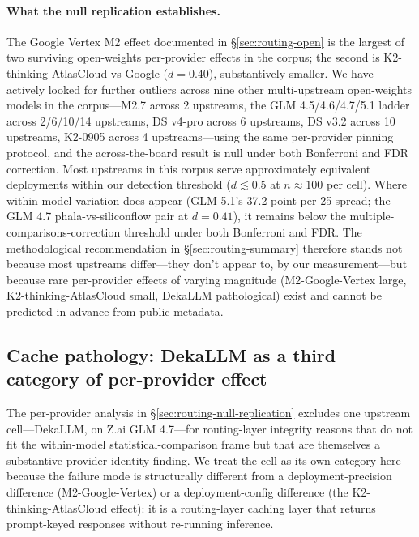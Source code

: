 \documentclass[11pt,a4paper]{article}
\begin{document}
\paragraph{What the null replication establishes.} The Google Vertex M2 effect documented in \S\ref{sec:routing-open} is the largest of two surviving open-weights per-provider effects in the corpus; the second is K2-thinking-AtlasCloud-vs-Google ($d{=}0.40$), substantively smaller. We have actively looked for further outliers across nine other multi-upstream open-weights models in the corpus---M2.7 across 2 upstreams, the GLM 4.5/4.6/4.7/5.1 ladder across 2/6/10/14 upstreams, DS v4-pro across 6 upstreams, DS v3.2 across 10 upstreams, K2-0905 across 4 upstreams---using the same per-provider pinning protocol, and the across-the-board result is null under both Bonferroni and FDR correction. Most upstreams in this corpus serve approximately equivalent deployments within our detection threshold ($d \lesssim 0.5$ at $n \approx 100$ per cell). Where within-model variation does appear (GLM 5.1's 37.2-point per-25 spread; the GLM 4.7 phala-vs-siliconflow pair at $d{=}0.41$), it remains below the multiple-comparisons-correction threshold under both Bonferroni and FDR. The methodological recommendation in \S\ref{sec:routing-summary} therefore stands not because most upstreams differ---they don't appear to, by our measurement---but because rare per-provider effects of varying magnitude (M2-Google-Vertex large, K2-thinking-AtlasCloud small, DekaLLM pathological) exist and cannot be predicted in advance from public metadata.


\subsection{Cache pathology: DekaLLM as a third category of per-provider effect}
\label{sec:routing-cache-pathology}

The per-provider analysis in \S\ref{sec:routing-null-replication} excludes one upstream cell---DekaLLM, on Z.ai GLM 4.7---for routing-layer integrity reasons that do not fit the within-model statistical-comparison frame but that are themselves a substantive provider-identity finding. We treat the cell as its own category here because the failure mode is structurally different from a deployment-precision difference (M2-Google-Vertex) or a deployment-config difference (the K2-thinking-AtlasCloud effect): it is a routing-layer caching layer that returns prompt-keyed responses without re-running inference.
\end{document}
